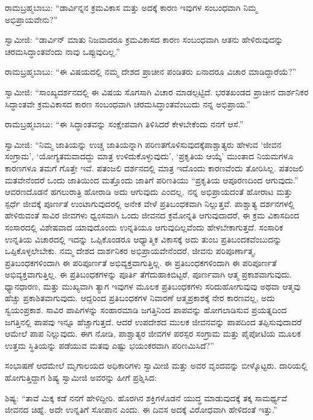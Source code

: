  ರಾಮಬ್ರಹ್ಮಬಾಬು: “ಡಾರ್ವಿನ್ನನ ಕ್ರಮವಿಕಾಸ ಮತ್ತು ಅದಕ್ಕೆ ಕಾರಣ ಇವುಗಳ ಸಂಬಂಧವಾಗಿ ನಿಮ್ಮ ಅಭಿಪ್ರಾಯವೇನು?” 

 ಸ್ವಾಮೀಜಿ: “ಡಾರ್ವಿನ್ ಮಾತು ನಿಜವಾದರೂ ಕ್ರಮವಿಕಾಸದ ಕಾರಣ ಸಂಬಂಧವಾಗಿ ಆತನು ಹೇಳಿರುವುದನ್ನು ಚರಮಸಿದ್ಧಾಂತವೆಂದು ನಾವು ಒಪ್ಪುವುದಿಲ್ಲ.” 

 ರಾಮಬ್ರಹ್ಮಬಾಬು: “ಈ ವಿಷಯದಲ್ಲಿ ನಮ್ಮ ದೇಶದ ಪ್ರಾಚೀನ ಪಂಡಿತರು ಏನಾದರೂ ವಿಚಾರ ಮಾಡಿದ್ದಾರೆಯೆ?” 

 ಸ್ವಾಮೀಜಿ: “ಸಾಂಖ್ಯದರ್ಶನದಲ್ಲಿ ಈ ವಿಷಯ ಸೊಗಸಾಗಿ ವಿಚಾರ ಮಾಡಲ್ಪಟ್ಟಿದೆ. ಭರತಖಂಡದ ಪ್ರಾಚೀನ ದಾರ್ಶನಿಕರ ಸಿದ್ಧಾಂತವೇ ಕ್ರಮವಿಕಾಸದ ಕಾರಣ ಸಂಬಂಧವಾಗಿ ಚರಮಸಿದ್ಧಾಂತವೆಂಬುದು ನನ್ನ ಅಭಿಪ್ರಾಯ.” 

 ರಾಮಬ್ರಹ್ಮಬಾಬು: “ಈ ಸಿದ್ಧಾಂತವನ್ನು ಸಂಕ್ಷೇಪವಾಗಿ ತಿಳಿಸಿದರೆ ಕೇಳಬೇಕೆಂದು ನನಗೆ ಆಸೆ.” 

 ಸ್ವಾಮೀಜಿ: “ನಿಮ್ಮ ಜಾತಿಯನ್ನು ಉಚ್ಚ ಜಾತಿಯನ್ನಾಗಿ ಪರಿಣತಗೊಳಿಸುವುದಕ್ಕೆ\break ಪಾಶ್ಚಾತ್ಯರು ಹೇಳುವ ‘ಜೀವನ ಸಂಗ್ರಾಮ’, ‘ಯೋಗ್ಯತಮವಾದದ್ದು ಮಾತ್ರ ಉಳಿದುಕೊಳ್ಳುವುದು’, ‘ಪ್ರಕೃತಿಯ ಆಯ್ಕೆ’ ಮುಂತಾದ ನಿಯಮಗಳೂ ಕಾರಣಗಳೂ ತಮಗೆ ಗೊತ್ತೇ ಇವೆ. ಪತಂಜಲಿ ದರ್ಶನದಲ್ಲಿ ಮಾತ್ರ ಇದೊಂದು ಕಾರಣವೆಂದು ತೋರಿಸಿಲ್ಲ. ಪತಂಜಲಿ ಮತವೇನೆಂದರೆ ಒಂದು ಜಾತಿಯಿಂದ ಮತ್ತೊಂದು ಜಾತಿಗೆ ಪರಿಣತಿಯು “ಪ್ರಕೃತಿಯ ಆಪೂರಣದಿಂದ ಆಗುವುದು.” ಆವರಣದೊಡನೆ ಹಗಲುರಾತ್ರಿ ಹೋರಾಡಿ ಅದು ಆಗುವುದು ಎಂದಲ್ಲ. ನನ್ನ ಅಭಿಪ್ರಾಯದಂತೆ ಹೋರಾಟ ಮತ್ತು ಸ್ಪರ್ಧೆ ಜೀವಕ್ಕೆ ಪೂರ್ಣತೆ ಉಂಟಾಗುವುದರಲ್ಲಿ ಅನೇಕ ವೇಳೆ ಪ್ರತಿಬಂಧಕವಾಗಿ ನಿಲ್ಲುತ್ತವೆ. ಪಾಶ್ಚಾತ್ಯ ದರ್ಶನಗಳಲ್ಲಿ ಹೇಳಿರುವಂತೆ ಸಾವಿರ ಜೀವಗಳು ಧ್ವಂಸವಾಗಿ ಒಂದು ಜೀವನದ ಕ್ರಮೋನ್ನತಿ ಆಗುವುದಾದರೆ, ಈ ಕ್ರಮ ವಿಕಾಸದಿಂದ ಸಂಸಾರದಲ್ಲಿ ವಿಶೇಷವಾದ ಯಾವುದೊಂದು ಉನ್ನತಿಯೂ ಆಗುವುದಿಲ್ಲವೆಂದು ಹೇಳಬೇಕಾಗುತ್ತದೆ. ಸಂಸಾರಿಕ ಉನ್ನತಿಯ ವಿಚಾರದಲ್ಲಿ ಇದನ್ನು ಒಪ್ಪಿಕೊಂಡರೂ ಆಧ್ಯಾತ್ಮಿಕ ವಿಕಾಸಕ್ಕೆ ಅದು ತುಂಬ ಪ್ರತಿಬಂದಕವೆಂಬುದನ್ನು ಒಪ್ಪಿಕೊಳ್ಳಲೇಬೇಕು. ನಮ್ಮ ದೇಶದ ದಾರ್ಶನಿಕರ ಅಭಿಪ್ರಾಯವೇನೆಂದರೆ, ಜೀವನು ಪರಿಪೂರ್ಣಾತ್ಮ, ಪ್ರತಿಬಂಧಕಗಳಿಂದಾಗಿ ಈ ಪರಿಪೂರ್ಣತೆ ಅಭಿವ್ಯಕ್ತವಾಗುತ್ತಿಲ್ಲ. ಈ ಪ್ರತಿಬಂಧಕಗಳಿಂದಾಗಿ ಈ ಪರಿಪೂರ್ಣತೆ ಅಭಿವ್ಯಕ್ತವಾಗುತ್ತಿಲ್ಲ. ಈ ಪ್ರತಿಬಂಧಕಗಳನ್ನು ಪೂರ್ತಿ ತೆಗೆದುಹಾಕಿಬಿಟ್ಟರೆ, ಪೂರ್ಣವಾಗಿ ಆತ್ಮ ಪ್ರಕಾಶವಾಗುವುದು. ಧ್ಯಾನಧಾರಣ, ಮತ್ತು ಮುಖ್ಯವಾಗಿ ತ್ಯಾಗ ಇವುಗಳ ಮೂಲಕ ಪ್ರತಿಬಂಧಕಗಳು ಸರಿದುಹೋಗುವುವು ಅಥವಾ ಆತ್ಮವು ಹೆಚ್ಚು ಪ್ರಕಾಶಿತವಾಗುವುದು. ಆದ್ದರಿಂದ ಪ್ರತಿಬಂಧಕಗಳ ನಿವಾರಣೆ ಆತ್ಮಪ್ರಕಾಶಕ್ಕೆ ನೇರ ಕಾರಣವಲ್ಲ, ಅದು ಸ್ವಯಂಪ್ರಕಾಶ. ಸಾವಿರ ಪಾಪಿಗಳನ್ನು ಸಂಹಾರಮಾಡಿ ಜಗತ್ತಿನಿಂದ ಪಾಪವನ್ನು ಹೋಗಲಾಡಿಸುವ ಪ್ರಯತ್ನದಿಂದ ಜಗತ್ತಿನಲ್ಲಿ ಪಾಪವು ಇನ್ನೂ ಹೆಚ್ಚಾಗುತ್ತದೆ. ಆದರೆ ಉಪದೇಶದ ಮುಲಕ ಜೀವನವನ್ನು ಪಾಪದಿಂದ ತಪ್ಪಿಸುವುದಾದರೆ ಆಮೇಲೆ ಪಾಪ ನಿಲ್ಲುವುದು. ಈಗ ನೋಡಿ, ಪಾಶ್ಚಾತ್ಯರ ಜೀವಗಳ ಪರಸ್ಪರ ಸಂಗ್ರಾಮ ಮತ್ತು ಪೈಪೋಟಿಯ ಮೂಲಕ ಉತ್ತಮ ಸ್ಥಿತಿಯನ್ನು ಪಡೆಯುವ ಮತವು ಎಷ್ಟು ಭಯಂಕರವಾಗಿ ಪರಿಣಮಿಸಿದೆ?” 

 ಸಂಭಾಷಣೆ ಆದಮೇಲೆ ಮೃಗಾಲಯದ ಅಧಿಕಾರಿಗಳು ಸ್ವಾಮೀಜಿ ಮತ್ತು ಅವರ ವೃಂದವನ್ನು ಬೀಳ್ಕೊಟ್ಟರು. ದಾರಿಯಲ್ಲಿ ಹೋಗುತ್ತಿದ್ದಾಗ ಶಿಷ್ಯ ಸ್ವಾಮೀಜಿ ಅವರನ್ನು ಹೀಗೆ ಪ್ರಶ್ನಿಸಿದ: 

 ಶಿಷ್ಯ: “ತಾವೆ ಮಿಕ್ಕ ಕಡೆ ನನಗೆ ಹೇಳಿದ್ದೀರಿ. ಹೊರಗಿನ ಶಕ್ತಿಗಳೊಡನೆ ಯುದ್ಧ ಮಾಡುವುದಕ್ಕೆ ತಕ್ಕ ಸಾಮರ್ಥ್ಯವೆ ಜೀವನದ ಚಿಹ್ನೆ. ಅದೇ ಉನ್ನತಿಗೆ ಸೋಪಾನ ಎಂದು. ಈ ದಿವಸ ಅದಕ್ಕೆ ವಿರೋಧವಾಗಿ ಹೇಳಿದಂತೆ ಇತ್ತು.” 


